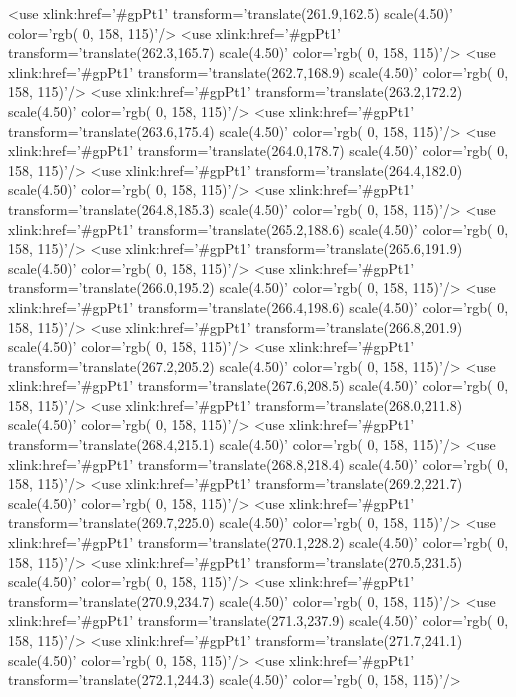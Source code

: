 	<use xlink:href='#gpPt1' transform='translate(261.9,162.5) scale(4.50)' color='rgb(  0, 158, 115)'/>
	<use xlink:href='#gpPt1' transform='translate(262.3,165.7) scale(4.50)' color='rgb(  0, 158, 115)'/>
	<use xlink:href='#gpPt1' transform='translate(262.7,168.9) scale(4.50)' color='rgb(  0, 158, 115)'/>
	<use xlink:href='#gpPt1' transform='translate(263.2,172.2) scale(4.50)' color='rgb(  0, 158, 115)'/>
	<use xlink:href='#gpPt1' transform='translate(263.6,175.4) scale(4.50)' color='rgb(  0, 158, 115)'/>
	<use xlink:href='#gpPt1' transform='translate(264.0,178.7) scale(4.50)' color='rgb(  0, 158, 115)'/>
	<use xlink:href='#gpPt1' transform='translate(264.4,182.0) scale(4.50)' color='rgb(  0, 158, 115)'/>
	<use xlink:href='#gpPt1' transform='translate(264.8,185.3) scale(4.50)' color='rgb(  0, 158, 115)'/>
	<use xlink:href='#gpPt1' transform='translate(265.2,188.6) scale(4.50)' color='rgb(  0, 158, 115)'/>
	<use xlink:href='#gpPt1' transform='translate(265.6,191.9) scale(4.50)' color='rgb(  0, 158, 115)'/>
	<use xlink:href='#gpPt1' transform='translate(266.0,195.2) scale(4.50)' color='rgb(  0, 158, 115)'/>
	<use xlink:href='#gpPt1' transform='translate(266.4,198.6) scale(4.50)' color='rgb(  0, 158, 115)'/>
	<use xlink:href='#gpPt1' transform='translate(266.8,201.9) scale(4.50)' color='rgb(  0, 158, 115)'/>
	<use xlink:href='#gpPt1' transform='translate(267.2,205.2) scale(4.50)' color='rgb(  0, 158, 115)'/>
	<use xlink:href='#gpPt1' transform='translate(267.6,208.5) scale(4.50)' color='rgb(  0, 158, 115)'/>
	<use xlink:href='#gpPt1' transform='translate(268.0,211.8) scale(4.50)' color='rgb(  0, 158, 115)'/>
	<use xlink:href='#gpPt1' transform='translate(268.4,215.1) scale(4.50)' color='rgb(  0, 158, 115)'/>
	<use xlink:href='#gpPt1' transform='translate(268.8,218.4) scale(4.50)' color='rgb(  0, 158, 115)'/>
	<use xlink:href='#gpPt1' transform='translate(269.2,221.7) scale(4.50)' color='rgb(  0, 158, 115)'/>
	<use xlink:href='#gpPt1' transform='translate(269.7,225.0) scale(4.50)' color='rgb(  0, 158, 115)'/>
	<use xlink:href='#gpPt1' transform='translate(270.1,228.2) scale(4.50)' color='rgb(  0, 158, 115)'/>
	<use xlink:href='#gpPt1' transform='translate(270.5,231.5) scale(4.50)' color='rgb(  0, 158, 115)'/>
	<use xlink:href='#gpPt1' transform='translate(270.9,234.7) scale(4.50)' color='rgb(  0, 158, 115)'/>
	<use xlink:href='#gpPt1' transform='translate(271.3,237.9) scale(4.50)' color='rgb(  0, 158, 115)'/>
	<use xlink:href='#gpPt1' transform='translate(271.7,241.1) scale(4.50)' color='rgb(  0, 158, 115)'/>
	<use xlink:href='#gpPt1' transform='translate(272.1,244.3) scale(4.50)' color='rgb(  0, 158, 115)'/>
